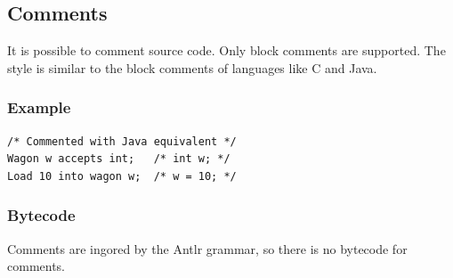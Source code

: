 \documentclass[10pt,a4paper]{article}
\begin{document}
\subsection{Comments}

It is possible to comment source code. Only block comments are supported. The style is similar to the block comments of languages like C and Java.

\subsubsection*{Example}

\begin{lstlisting}
/* Commented with Java equivalent */
Wagon w accepts int;   /* int w; */
Load 10 into wagon w;  /* w = 10; */
\end{lstlisting}

\subsubsection*{Bytecode}

Comments are ingored by the Antlr grammar, so there is no bytecode for comments.
\end{document}
